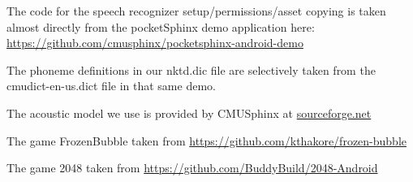\documentclass[11pt, oneside]{article}
\begin{document}
The code for the speech recognizer setup/permissions/asset copying is
taken almost directly from the pocketSphinx demo application here:
\url{https://github.com/cmusphinx/pocketsphinx-android-demo}

The phoneme definitions in our nktd.dic file are selectively taken
from the cmudict-en-us.dict file in that same demo.

The acoustic model we use is provided by CMUSphinx at
\href{https://sourceforge.net/projects/cmusphinx/files/Acoustic\%20and\%20Language\%20Models/US\%20English/}{sourceforge.net}

The game FrozenBubble taken from
\url{https://github.com/kthakore/frozen-bubble}

The game 2048 taken from
\url{https://github.com/BuddyBuild/2048-Android}
    
\end{document}
